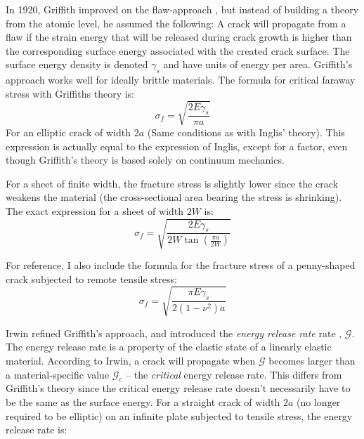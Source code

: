 In 1920, Griffith improved on the flaw-approach \cite{griffith1920phenomena}, but instead of building a theory from the atomic level, he assumed the following: A crack will propagate from a flaw if the strain energy that will be released during crack growth is higher than the corresponding surface energy associated with the created crack surface. The surface energy density is denoted $\gamma_s$ and have units of energy per area. Griffith's approach works well for ideally brittle materials. The formula for critical faraway stress with Griffiths theory is:
\begin{equation}
	\sigma_f = \sqrt{\frac{2E\gamma_s}{\pi a}}
\end{equation}
For an elliptic crack of width $2a$ (Same conditions as with Inglis' theory). This expression is actually equal to the expression of Inglis, except for a factor, even though Griffith's theory is based solely on continuum mechanics.

For a sheet of finite width, the fracture stress is slightly lower since the crack weakens the material (the cross-sectional area bearing the stress is shrinking). The exact expression for a sheet of width $2W$ is:
%
 \begin{equation}
 	\sigma_f = \sqrt{\frac{2E\gamma_s}{2W\tan\left( \frac{\pi a}{2W}\right)}}
 	\label{eq:griffith_finite_sheet}
 \end{equation}

For reference, I also include the formula for the fracture stress of a penny-shaped crack subjected to remote tensile stress:
\begin{equation}
	\sigma_f = \sqrt{\frac{\pi E \gamma_s }{2(1-\nu^2)a}}
\end{equation}
 

 Irwin refined Griffith's approach, and introduced the \emph{energy release rate} rate \cite{irwin2onset}, $\mathcal{G}$. The energy release rate is a property of the elastic state of a linearly elastic material. According to Irwin, a crack will propagate when $\mathcal{G}$ becomes larger than a material-specific value $\mathcal{G}_c$ -- the \emph{critical} energy release rate. This differs from Griffith's theory since the critical energy release rate doesn't necessarily have to be the same as the surface energy. For a straight crack of width $2a$ (no longer required to be elliptic) on an infinite plate subjected to tensile stress, the energy release rate is:

